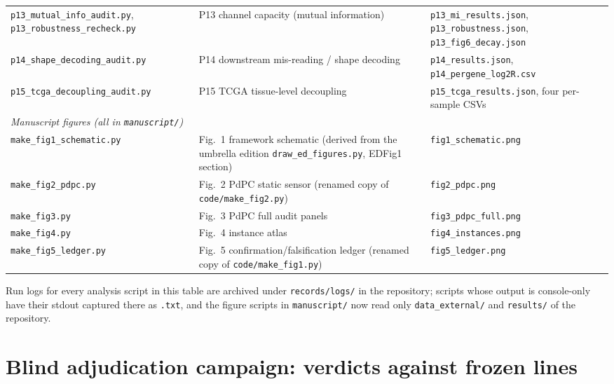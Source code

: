 \documentclass[11pt]{article}
\begin{document}
\begin{longtable}{p{5.6cm} p{6.6cm} p{3.6cm}}
\texttt{p13\_\allowbreak{}mutual\_\allowbreak{}info\_\allowbreak{}audit.py}, \texttt{p13\_\allowbreak{}robustness\_\allowbreak{}recheck.py} & P13 channel capacity (mutual information) & \texttt{p13\_\allowbreak{}mi\_\allowbreak{}results.json}, \texttt{p13\_\allowbreak{}robustness.json}, \texttt{p13\_\allowbreak{}fig6\_\allowbreak{}decay.json} \\
\texttt{p14\_\allowbreak{}shape\_\allowbreak{}decoding\_\allowbreak{}audit.py} & P14 downstream mis-reading / shape decoding & \texttt{p14\_\allowbreak{}results.json}, \texttt{p14\_\allowbreak{}pergene\_\allowbreak{}log2R.csv} \\
\texttt{p15\_\allowbreak{}tcga\_\allowbreak{}decoupling\_\allowbreak{}audit.py} & P15 TCGA tissue-level decoupling & \texttt{p15\_\allowbreak{}tcga\_\allowbreak{}results.json}, four per-sample CSVs \\
\multicolumn{3}{l}{\emph{Manuscript figures (all in \texttt{manuscript/})}}\\
\texttt{make\_\allowbreak{}fig1\_\allowbreak{}schematic.py} & Fig.~1 framework schematic (derived from the umbrella edition \texttt{draw\_\allowbreak{}ed\_\allowbreak{}figures.py}, EDFig1 section) & \texttt{fig1\_\allowbreak{}schematic.png} \\
\texttt{make\_\allowbreak{}fig2\_\allowbreak{}pdpc.py} & Fig.~2 PdPC static sensor (renamed copy of \texttt{code/make\_\allowbreak{}fig2.py}) & \texttt{fig2\_\allowbreak{}pdpc.png} \\
\texttt{make\_\allowbreak{}fig3.py} & Fig.~3 PdPC full audit panels & \texttt{fig3\_\allowbreak{}pdpc\_\allowbreak{}full.png} \\
\texttt{make\_\allowbreak{}fig4.py} & Fig.~4 instance atlas & \texttt{fig4\_\allowbreak{}instances.png} \\
\texttt{make\_\allowbreak{}fig5\_\allowbreak{}ledger.py} & Fig.~5 confirmation/falsification ledger (renamed copy of \texttt{code/make\_\allowbreak{}fig1.py}) & \texttt{fig5\_\allowbreak{}ledger.png} \\
\bottomrule
\end{longtable}

Run logs for every analysis script in this table are archived under \texttt{records/logs/} in the repository; scripts whose output is console-only have their stdout captured there as \texttt{.txt}, and the figure scripts in \texttt{manuscript/} now read only \texttt{data\_external/} and \texttt{results/} of the repository.

\section{Blind adjudication campaign: verdicts against frozen lines}
\end{document}
